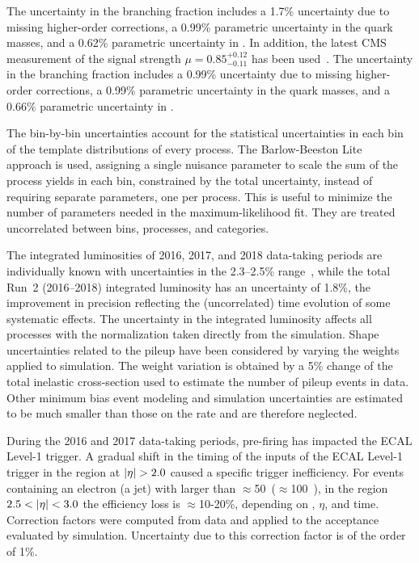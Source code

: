 The uncertainty in the \Htt branching fraction includes a 1.7\% uncertainty due to missing higher-order corrections, a 0.99\% parametric uncertainty in the quark masses, and a 0.62\% parametric uncertainty in \as. In addition, the latest CMS measurement of the \Htt signal strength $\mu = 0.85^{+0.12}_{-0.11}$ has been used~\cite{CMS:2020dvp}. The uncertainty in the \HWW branching fraction includes a 0.99\% uncertainty due to missing higher-order corrections, a 0.99\% parametric uncertainty in the quark masses, and a 0.66\% parametric uncertainty in \as.

The bin-by-bin uncertainties account for the statistical uncertainties in each bin of the template distributions of every process. The Barlow-Beeston Lite~\cite{Conway:2011in, Barlow:1993dm} approach is used, assigning a single nuisance parameter to scale the sum of the process yields in each bin, constrained by the total uncertainty, instead of requiring separate parameters, one per process. This is useful to minimize the number of parameters needed in the maximum-likelihood fit. They are treated uncorrelated between bins, processes, and categories.

The integrated luminosities of 2016, 2017, and 2018 data-taking periods are individually known with uncertainties in the 2.3--2.5\% range~\cite{CMS:2017sdi, CMS:2018elu, CMS:2019jhq}, while the total Run~2 (2016--2018) integrated luminosity has an uncertainty of 1.8\%, the improvement in precision reflecting the (uncorrelated) time evolution of some systematic effects. The uncertainty in the integrated luminosity affects all processes with the normalization taken directly from the simulation. Shape uncertainties related to the pileup have been considered by varying the weights applied to simulation. The weight variation is obtained by a 5\% change of the total inelastic cross-section used to estimate the number of pileup events in data. Other minimum bias event modeling and simulation uncertainties are estimated to be much smaller than those on the rate and are therefore neglected.

During the 2016 and 2017 data-taking periods, pre-firing has impacted the ECAL Level-1 trigger. A gradual shift in the timing of the inputs of the ECAL Level-1 trigger in the region at $\lvert\eta\rvert > 2.0$ caused a specific trigger inefficiency. For events containing an electron (a jet) with \pt larger than $\approx$50~\GeV ($\approx$100~\GeV), in the region $2.5 < \lvert\eta\rvert < 3.0$ the efficiency loss is $\approx$10-20\%, depending on \pt, $\eta$, and time. Correction factors were computed from data and applied to the acceptance evaluated by simulation. Uncertainty due to this correction factor is of the order of 1\%.
